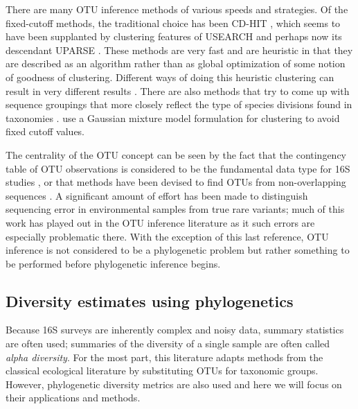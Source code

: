 \documentclass{amsart}
\begin{document}
There are many OTU inference methods of various speeds and strategies.
Of the fixed-cutoff methods, the traditional choice has been CD-HIT \citep{li2006cdhit}, which seems to have been supplanted by clustering features of USEARCH \citep{edgar2010usearch} and perhaps now its descendant UPARSE \citep{edgar2013uparse}.
These methods are very fast and are heuristic in that they are described as an algorithm rather than as global optimization of some notion of goodness of clustering.
Different ways of doing this heuristic clustering can result in very different results \citep{white2010alignment}.
There are also methods that try to come up with sequence groupings that more closely reflect the type of species divisions found in taxonomies \citep{navlakha2009finding}.
\citet{hao2011clustering} use a Gaussian mixture model formulation for clustering to avoid fixed cutoff values.

The centrality of the OTU concept can be seen by the fact that the contingency table of OTU observations is considered to be the fundamental data type for 16S studies \citep{mcdonald2012biological}, or that methods have been devised to find OTUs from non-overlapping sequences \citep{sharpton2011phylotu}.
A significant amount of effort has been made to distinguish sequencing error in environmental samples from true rare variants; much of this work has played out in the OTU inference literature \citep{quince2009accurate,quince2011removing,bragg2012fast,edgar2013uparse} as it such errors are especially problematic there.
With the exception of this last reference, OTU inference is not considered to be a phylogenetic problem but rather something to be performed before phylogenetic inference begins.


\subsection{Diversity estimates using phylogenetics}
Because 16S surveys are inherently complex and noisy data, summary statistics are often used; summaries of the diversity of a single sample are often called \emph{alpha diversity}.
For the most part, this literature adapts methods from the classical ecological literature by substituting OTUs for taxonomic groups.
However, phylogenetic diversity metrics are also used and here we will focus on their applications and methods.
\end{document}
